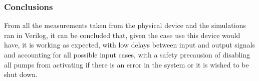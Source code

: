 \subsubsection{\color{orange}Conclusions}
From all the measurements taken from the physical device and the simulations ran in Verilog, it can be concluded
that, given the case use this device would have, it is working as expected, with low delays between input and
output signals and accounting for all possible input cases, with a safety precausion of disabling all pumps from
activating if there is an error in the system or it is wished to be shut down.